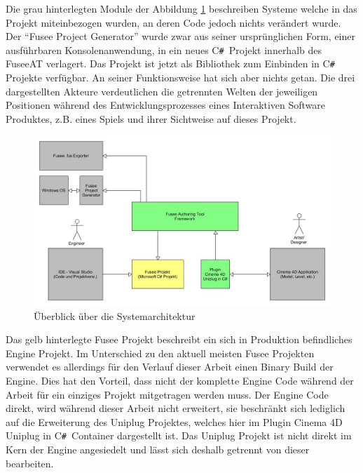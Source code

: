 \documentclass[pagesize, paper=a4, fontsize=12pt, titlepage=true, headings=small, headnosepline, abstractoff, liststotoc, nochapterprefix, plainheadsepline, twoside]{scrreprt}
\newcommand{\CSS}{C\texttt{\# }}
\begin{document}
Die grau hinterlegten Module der Abbildung \ref{FuseeATSystemÜberblick} beschreiben Systeme welche in das Projekt miteinbezogen wurden, an deren Code jedoch nichts verändert wurde. Der “Fusee Project Generator” wurde zwar aus seiner ursprünglichen Form, einer ausführbaren Konsolenanwendung, in ein neues \CSS Projekt innerhalb des FuseeAT verlagert. Das Projekt ist jetzt als Bibliothek zum Einbinden in \CSS Projekte verfügbar. An seiner Funktionsweise hat sich aber nichts getan. Die drei dargestellten Akteure verdeutlichen die getrennten Welten der jeweiligen Positionen während des Entwicklungsprozesses eines Interaktiven Software Produktes, z.B. eines Spiels und ihrer Sichtweise auf dieses Projekt.
\begin{figure}[ht]
	\centering
	\includegraphics[width=\linewidth]{Bilder/Ueberblick_System.jpg}
	\caption{Überblick über die Systemarchitektur}
	\label{FuseeATSystemÜberblick}
\end{figure}
Das gelb hinterlegte Fusee Projekt beschreibt ein sich in Produktion befindliches Engine Projekt. Im Unterschied zu den aktuell meisten Fusee Projekten verwendet es allerdings für den Verlauf dieser Arbeit einen Binary Build der Engine. Dies hat den Vorteil, dass nicht der komplette Engine Code während der Arbeit für ein einziges Projekt mitgetragen werden muss. Der Engine Code direkt, wird während dieser Arbeit nicht erweitert, sie beschränkt sich lediglich auf die Erweiterung des Uniplug Projektes, welches hier im Plugin Cinema 4D Uniplug in \CSS Container dargestellt ist. Das Uniplug Projekt ist nicht direkt im Kern der Engine angesiedelt und lässt sich deshalb getrennt von dieser bearbeiten.
\\
\end{document}
